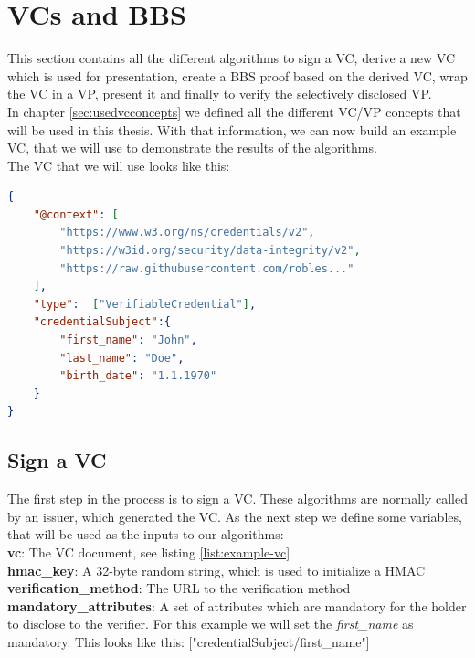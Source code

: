 \documentclass[
	a4paper               %
	,BCOR=0mm            %
	,bibliography=totoc   %
	,listof=totoc         %
	,monolingual
	,twoside=false
]{bfhthesis}              %
\begin{document}
\section{VCs and BBS}
This section contains all the different algorithms to sign a VC, derive a new VC which is used for presentation, create a BBS proof based on the derived VC, wrap the VC in a VP, present it and finally to verify the selectively disclosed VP.\\

In chapter \ref{sec:usedvcconcepts} we defined all the different VC/VP concepts that will be used in this thesis. With that information, we can now build an example VC, that we will use to demonstrate the results of the algorithms.\\
The VC that we will use looks like this:
\begin{lstlisting}[language=json,firstnumber=1,caption={Example VC},captionpos=b,label={list:example-vc}]
{
	"@context": [
		"https://www.w3.org/ns/credentials/v2",
		"https://w3id.org/security/data-integrity/v2",
		"https://raw.githubusercontent.com/robles..."
	],
	"type":  ["VerifiableCredential"],
	"credentialSubject":{
		"first_name": "John",
		"last_name": "Doe",
		"birth_date": "1.1.1970"
	}
}
\end{lstlisting}

\subsection{Sign a VC}
The first step in the process is to sign a VC.
These algorithms are normally called by an issuer, which generated the VC.
As the next step we define some variables, that will be used as the inputs to our algorithms:\\
\textbf{vc}: The VC document, see listing \ref{list:example-vc}\\
\textbf{hmac\_key}: A 32-byte random string, which is used to initialize a HMAC\\
\textbf{verification\_method}: The URL to the verification method\\
\textbf{mandatory\_attributes}: A set of attributes which are mandatory for the holder to disclose to the verifier. For this example we will set the \textit{first\_name} as mandatory. This looks like this: ["credentialSubject/first\_name"]\\
\end{document}

